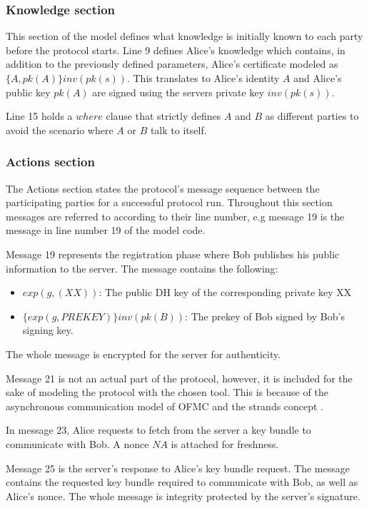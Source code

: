 \subsubsection{Knowledge section}
This section of the model defines what knowledge is initially known to each party before the protocol starts. Line 9 defines Alice's knowledge which contains, in addition to the previously defined parameters, Alice's certificate modeled as $\{A, pk(A)\}inv(pk(s))$. This translates to Alice's identity $A$ and Alice's public key $pk(A)$ are signed using the servers private key $inv(pk(s))$. 

Line 15 holds a $where$ clause that strictly defines $A$ and $B$ as different parties to avoid the scenario where $A$ or $B$ talk to itself.
\subsubsection{Actions section}
The Actions section states the protocol's message sequence between the participating parties for a successful protocol run. Throughout this section messages are referred to according to their line number, e.g message 19 is the message in line number 19 of the model code.
\par
Message 19 represents the registration phase where Bob publishes his public information to the server. The message contains the following:
\begin{itemize}
	\item $exp(g,(XX))$: The public DH key of the corresponding private key XX
	\item $\{exp(g,PREKEY)\}inv(pk(B))$: The prekey of Bob signed by Bob's signing key.
\end{itemize}
The whole message is encrypted for the server for authenticity.
\par
Message 21 is not an actual part of the protocol, however, it is included for the sake of modeling the protocol with the chosen tool. This is because of the asynchronous communication model of OFMC and the strands concept \cite{ofmcTut}.
\par 
In message 23, Alice requests to fetch from the server a key bundle to communicate with Bob. A nonce $NA$ is attached for freshness.
\par
Message 25 is the server's response to Alice's key bundle request. The message contains the requested key bundle required to communicate with Bob, as well as Alice's nonce. The whole message is integrity protected by the server's signature.
\par
